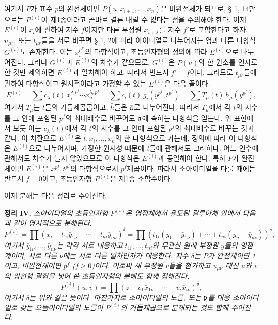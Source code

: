 여기서 \(P\)가 표수 \(p\)의 완전체이면 \(P(u,x_{i+1},\ldots,x_n)\)은 비완전체가 되므로, § 1, 14만으로는 \(P^{(i)}\)이 제1종이라고 곧바로 결론 내릴 수 없다는 점을 주의해야 한다. 이제 \(E^{(i)}\)이 \(x_i\)에 관하여 지수 \(f\)이지만 다른 부정원 \(x_{i+\lambda}\)를 지수 \(f'\)로 포함한다고 하자. \(u_{\mu r}\), 또는 \(t_{\mu r}\)들을 서로 바꾸면 § 1, 2에 따라 아이디얼로 나누어지는 영과 다른 다항식 \(G^{(i)}\)도 존재한다. 이는 \(x_i^{p^{f'}}\)의 다항식이고, 초등인자형의 정의에 따라 \(E^{(i)}\)으로 나누어진다. 그러나 \(G^{(i)}\)과 \(E^{(i)}\)의 차수가 같으므로, \(G^{(i)}\)은 \(P(u)\)의 한 원소를 인자로 한 것만 제외하면 \(E^{(i)}\)과 일치해야 하고, 따라서 반드시 \(f'=f\)이다. 그러므로 \(t_{\mu r}\)들에 관하여 다항식이고 원시적이라고 가정할 수 있는 \(E^{(i)}\)은 다음 꼴이다.
\[
  E^{(i)}=\sum c_\lambda(t)\,x_i^{\lambda_i p^f}\cdots x_n^{\lambda_n p^f}
       =\sum c_i(t)\,g_i(y^{p^f},t^{p^f})
       =\sum T_\mu(t)\,\bar h_\mu(y^{p^f}),
\]
여기서 \(T_\mu\)는 \(t\)들의 거듭제곱곱이고, \(\bar h\)들은 \(\bar{\mathfrak a}\)로 나누어진다. 따라서 \(T_\mu\)에서 각 \(t\)의 지수를 그 안에 포함된 \(p^f\)의 최대배수로 바꾸어도 \(\mathfrak a\)에 속하는 다항식을 얻는다. 위 표현에서 보듯 이는 \(c_\lambda(t)\)에서 각 \(t\)의 지수를 그 안에 포함된 \(p^f\)의 최대배수로 바꾸는 것과 같다. 이 치환으로 \(E^{(i)}\)은 \(t,x_i,\ldots,x_n\)의 한 다항식으로 가는데, 정의에 따라 이 다항식은 \(E^{(i)}\)으로 나누어지며, 가정한 원시성 때문에 \(t\)들에 관해서도 그러하다. 어느 인수에 관해서도 차수가 늘지 않았으므로 이 다항식은 \(E^{(i)}\)과 동일해야 한다. 특히 \(P\)가 완전체이면 \(E^{(i)}\)은 \(x^{p^f},t^{p^f}\)의 다항식으로서 \(p^f\)제곱이다. 따라서 소아이디얼을 다룰 때에는 반드시 \(f=0\)이고, 초등인자형 \(P^{(i)}\)은 제1종 소함수이다.

이제 분해는 다음 정리로 주어진다.

\textbf{정리 IV.} \emph{소아이디얼의 초등인자형 \(P^{(i)}\)은 영점체에서 유도된 갈루아체 안에서 다음과 같이 명시적으로 분해된다.}
\[
 P^{(i)}=\prod (x_i-t_{1i}\bar y_{1\nu}-\cdots-t_{ni}\bar y_{n\nu})^\delta
 =\prod (t_{1i}(y_1-\bar y_{1\nu})+\cdots+t_{ni}(y_n-\bar y_{n\nu}))^\delta,
\]
\emph{여기서 \(\bar y_{1\nu},\ldots,\bar y_{n\nu}\)는 각각 서로 대응하고 \(t_{1i},\ldots,t_{ni}\)와 무관한 원래 부정원 \(y\)들의 영점계이며, 서로 다른 \(\nu\)에는 서로 다른 일차인자가 대응한다. 지수 \(\delta\)는 \(P\)가 완전체이면 1이고, 비완전체이면 \(p^f\) (\(f\geq0\))이다. 이로써 새 부정원 \(v\)들을 첨가하고 \(u_{\mu\nu}\) 대신 \(u\)와 \(v\)의 쌍선형 결합을 넣어 쓴 초등인자형의 분해도 함께 정해진다.}
\[
 P^{(i)}(u,v)=\prod (z-v_1\bar x_{1\nu}-\cdots-v_i\bar x_{i\nu})^\delta,
\]
\emph{여기서 \(\delta\)는 위와 같은 뜻이다. 마찬가지로 소아이디얼의 노름, 또는 \(\mathfrak p\)를 대응 소아이디얼로 갖는 으뜸아이디얼의 노름이 \(P^{(i)}\)의 거듭제곱으로 분해되는 것도 함께 주어진다.}

